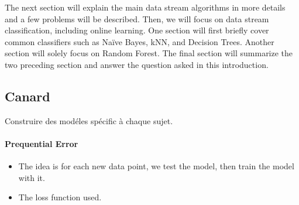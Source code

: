 The next section will explain the main data stream
algorithms in more details and a few problems will
be described.  Then, we will focus on data stream
classification, including online learning. One
section will first briefly cover common
classifiers such as Naïve Bayes, kNN, and Decision
Trees. Another section will solely focus on Random
Forest.  The final section will summarize the two
preceding section and answer the question asked in
this introduction.


\subsection{Canard}
Construire des modéles spécific à chaque sujet.

\paragraph{Prequential Error~\cite{issues_learning_from_stream}}
\begin{itemize}
	\item The idea is for each new data point, we test the model, then train the model with it.
	\item The loss function used.
\end{itemize}
